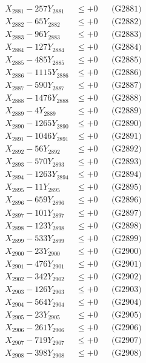 \documentclass[a4paper,10pt]{article}
\begin{document}
{\begin{align}
\allowbreak
X_{2881} - 257Y_{2881} &\leq +0 && \text{(G2881)} \\
X_{2882} - 65Y_{2882} &\leq +0 && \text{(G2882)} \\
X_{2883} - 96Y_{2883} &\leq +0 && \text{(G2883)} \\
X_{2884} - 127Y_{2884} &\leq +0 && \text{(G2884)} \\
X_{2885} - 485Y_{2885} &\leq +0 && \text{(G2885)} \\
X_{2886} - 1115Y_{2886} &\leq +0 && \text{(G2886)} \\
X_{2887} - 590Y_{2887} &\leq +0 && \text{(G2887)} \\
X_{2888} - 1476Y_{2888} &\leq +0 && \text{(G2888)} \\
X_{2889} - 4Y_{2889} &\leq +0 && \text{(G2889)} \\
X_{2890} - 1265Y_{2890} &\leq +0 && \text{(G2890)} \\
\allowbreak
X_{2891} - 1046Y_{2891} &\leq +0 && \text{(G2891)} \\
X_{2892} - 56Y_{2892} &\leq +0 && \text{(G2892)} \\
X_{2893} - 570Y_{2893} &\leq +0 && \text{(G2893)} \\
X_{2894} - 1263Y_{2894} &\leq +0 && \text{(G2894)} \\
X_{2895} - 11Y_{2895} &\leq +0 && \text{(G2895)} \\
X_{2896} - 659Y_{2896} &\leq +0 && \text{(G2896)} \\
X_{2897} - 101Y_{2897} &\leq +0 && \text{(G2897)} \\
X_{2898} - 123Y_{2898} &\leq +0 && \text{(G2898)} \\
X_{2899} - 533Y_{2899} &\leq +0 && \text{(G2899)} \\
X_{2900} - 23Y_{2900} &\leq +0 && \text{(G2900)} \\
\allowbreak
X_{2901} - 476Y_{2901} &\leq +0 && \text{(G2901)} \\
X_{2902} - 342Y_{2902} &\leq +0 && \text{(G2902)} \\
X_{2903} - 126Y_{2903} &\leq +0 && \text{(G2903)} \\
X_{2904} - 564Y_{2904} &\leq +0 && \text{(G2904)} \\
X_{2905} - 23Y_{2905} &\leq +0 && \text{(G2905)} \\
X_{2906} - 261Y_{2906} &\leq +0 && \text{(G2906)} \\
X_{2907} - 719Y_{2907} &\leq +0 && \text{(G2907)} \\
X_{2908} - 398Y_{2908} &\leq +0 && \text{(G2908)} \\

\end{align}}
\end{document}
